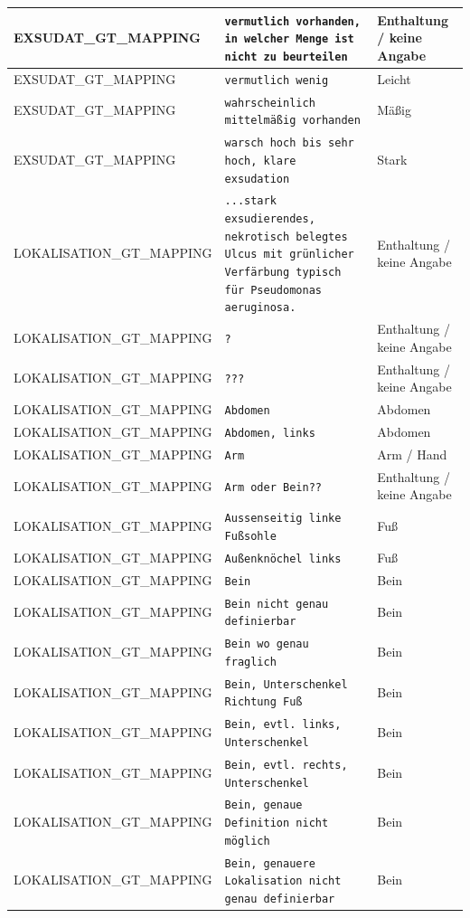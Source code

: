 \begin{longtable}{|p{3.5cm}|p{5cm}|p{6.5cm}|}
EXSUDAT\_GT\_MAPPING & \texttt{vermutlich vorhanden, in welcher Menge ist nicht zu beurteilen} & Enthaltung / keine Angabe \\ \hline
EXSUDAT\_GT\_MAPPING & \texttt{vermutlich wenig} & Leicht \\ \hline
EXSUDAT\_GT\_MAPPING & \texttt{wahrscheinlich mittelmäßig vorhanden} & Mäßig \\ \hline
EXSUDAT\_GT\_MAPPING & \texttt{warsch hoch bis sehr hoch,  klare exsudation} & Stark \\ \hline
LOKALISATION\_GT\_MAPPING & \texttt{...stark exsudierendes, nekrotisch belegtes Ulcus mit grünlicher Verfärbung typisch für Pseudomonas aeruginosa.} & Enthaltung / keine Angabe \\ \hline
LOKALISATION\_GT\_MAPPING & \texttt{?} & Enthaltung / keine Angabe \\ \hline
LOKALISATION\_GT\_MAPPING & \texttt{???} & Enthaltung / keine Angabe \\ \hline
LOKALISATION\_GT\_MAPPING & \texttt{Abdomen} & Abdomen \\ \hline
LOKALISATION\_GT\_MAPPING & \texttt{Abdomen, links} & Abdomen \\ \hline
LOKALISATION\_GT\_MAPPING & \texttt{Arm} & Arm / Hand \\ \hline
LOKALISATION\_GT\_MAPPING & \texttt{Arm oder Bein??} & Enthaltung / keine Angabe \\ \hline
LOKALISATION\_GT\_MAPPING & \texttt{Aussenseitig linke Fußsohle} & Fuß \\ \hline
LOKALISATION\_GT\_MAPPING & \texttt{Außenknöchel links} & Fuß \\ \hline
LOKALISATION\_GT\_MAPPING & \texttt{Bein} & Bein \\ \hline
LOKALISATION\_GT\_MAPPING & \texttt{Bein nicht genau definierbar} & Bein \\ \hline
LOKALISATION\_GT\_MAPPING & \texttt{Bein wo genau fraglich} & Bein \\ \hline
LOKALISATION\_GT\_MAPPING & \texttt{Bein, Unterschenkel Richtung Fuß} & Bein \\ \hline
LOKALISATION\_GT\_MAPPING & \texttt{Bein, evtl. links, Unterschenkel} & Bein \\ \hline
LOKALISATION\_GT\_MAPPING & \texttt{Bein, evtl. rechts, Unterschenkel} & Bein \\ \hline
LOKALISATION\_GT\_MAPPING & \texttt{Bein, genaue Definition nicht möglich} & Bein \\ \hline
LOKALISATION\_GT\_MAPPING & \texttt{Bein, genauere Lokalisation nicht genau definierbar} & Bein \\ \hline

\end{longtable}
